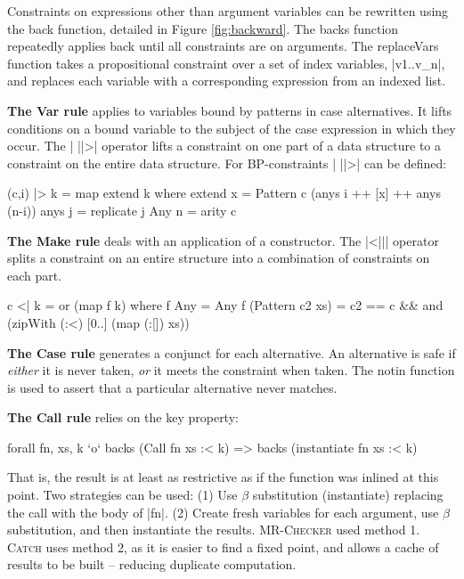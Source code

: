 \documentclass[preprint]{sigplanconf}
\newcommand{\C}[1]{\textsf{#1}}
\newcommand{\catch}{\textsc{Catch}}
\newcommand{\newtool}{\anon{\catch07}{\catch}}
\newcommand{\oldtool}{\anon{\catch05}{\textsc{MR-Checker}}}
\newcommand{\para}[1]{\vspace{2mm}\noindent\textbf{#1}}
\newcommand{\anon}[2]{#2}
\begin{document}
Constraints on expressions other than argument variables can be rewritten using the \C{back} function, detailed in Figure \ref{fig:backward}. The \C{backs} function repeatedly applies \C{back} until all constraints are on arguments. The \C{replaceVars} function takes a propositional constraint over a set of index variables, |v1..v_n|, and replaces each variable with a corresponding expression from an indexed list.

\para{The \C{Var} rule} applies to variables bound by patterns in case alternatives. It lifts conditions on a bound variable to the subject of the case expression in which they occur. The | ||>| operator lifts a constraint on one part of a data structure to a constraint on the entire data structure. For BP-constraints | ||>| can be defined:

\begin{code}
(c,i) |> k = map extend k
    where
    extend x = Pattern c (anys i ++ [x] ++ anys (n-i))
    anys j = replicate j Any
    n = arity c
\end{code}

\para{The \C{Make} rule} deals with an application of a constructor. The |<||| operator splits a constraint on an entire structure into a combination of constraints on each part.

\begin{code}
c <| k = or (map f k)
    where
    f Any = Any
    f (Pattern c2 xs) = c2 == c &&
        and (zipWith (:<) [0..] (map (:[]) xs))
\end{code}

\para{The \C{Case} rule} generates a conjunct for each alternative. An alternative is safe if \textit{either} it is never taken, \textit{or} it meets the constraint when taken. The \C{notin} function is used to assert that a particular alternative never matches.

\para{The \C{Call} rule} relies on the key property:

\begin{code}
forall fn, xs, k `o`  backs (Call fn xs :< k) =>
                      backs (instantiate fn xs :< k)
\end{code}

That is, the result is at least as restrictive as if the function was inlined at this point. Two strategies can be used: (1) Use $\beta$ substitution (\C{instantiate}) replacing the call with the body of |fn|. (2) Create fresh variables for each argument, use $\beta$ substitution, and then instantiate the results. \oldtool{} used method 1. \newtool{} uses method 2, as it is easier to find a fixed point, and allows a cache of results to be built -- reducing duplicate computation.
\end{document}
